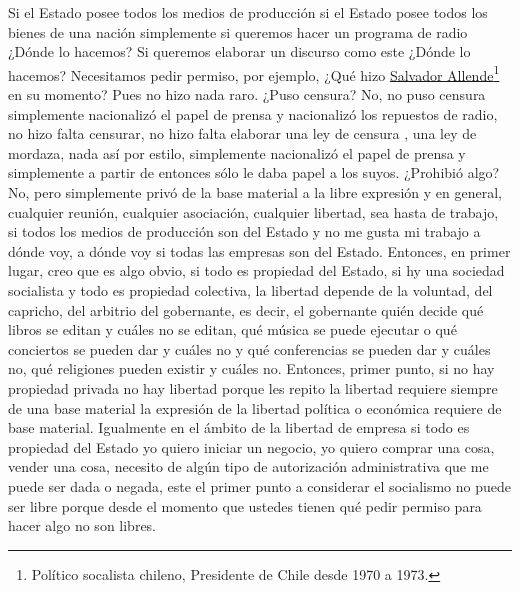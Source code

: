 Si el Estado posee todos los medios de producción si el Estado posee todos los bienes de una nación simplemente si queremos hacer un programa de radio ¿Dónde lo hacemos? Si queremos elaborar un discurso como este ¿Dónde lo hacemos? Necesitamos pedir permiso, por ejemplo, ¿Qué hizo \href{https://en.wikipedia.org/wiki/Salvador_Allende}{Salvador Allende}\footnote{Político socalista chileno, Presidente de Chile desde 1970 a 1973.} en su momento? Pues no hizo nada raro. ¿Puso censura? No, no puso censura simplemente nacionalizó el papel de prensa y nacionalizó los repuestos de radio, no hizo falta censurar, no hizo falta elaborar una ley de censura , una ley de mordaza, nada así por estilo, simplemente nacionalizó el papel de prensa y simplemente a partir de entonces sólo le daba papel a los suyos. ¿Prohibió algo? No, pero simplemente privó de la base material a la libre expresión y en general, cualquier reunión, cualquier asociación, cualquier libertad, sea hasta de trabajo, si todos los medios de producción son del Estado y no me gusta mi trabajo a dónde voy, a dónde voy si todas las empresas son del Estado. Entonces, en primer lugar, creo que es algo obvio, si todo es propiedad del Estado, si hy una sociedad socialista y todo es propiedad colectiva, la libertad depende de la voluntad, del capricho, del arbitrio del gobernante, es decir, el gobernante quién decide qué libros se editan y cuáles no se editan, qué música se puede ejecutar o qué conciertos se pueden dar y cuáles no y qué conferencias se pueden dar y cuáles no, qué religiones pueden existir y cuáles no. Entonces, primer punto, si no hay propiedad privada no hay libertad porque les repito la libertad requiere siempre de una base material la expresión de la libertad política o económica requiere de base material. Igualmente en el ámbito de la libertad de empresa si todo es propiedad del Estado yo quiero iniciar un negocio, yo quiero comprar una cosa, vender una cosa, necesito de algún tipo de autorización administrativa que me puede ser dada o negada, este el primer punto a considerar el socialismo no puede ser libre porque desde el momento que ustedes tienen qué pedir permiso para hacer algo no son libres.

